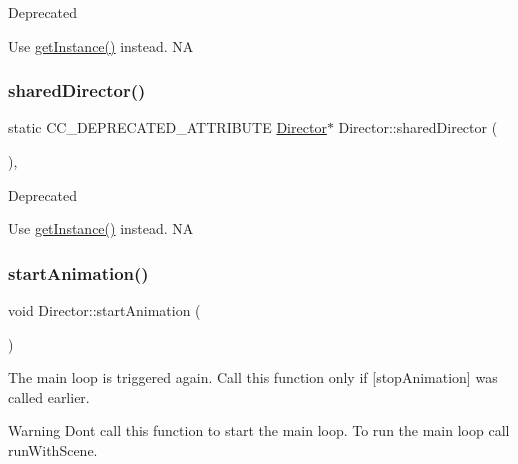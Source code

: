 \begin{DoxyRefDesc}{Deprecated}
\item[\hyperlink{deprecated__deprecated000051}{Deprecated}]Use \hyperlink{classDirector_a8d2a4ca9e20cd400ddadd516efa111e0}{get\+Instance()} instead.  NA \end{DoxyRefDesc}
\mbox{\label{classDirector_ade6993ad99aefbbe5643b60749871a39}} 
\subsubsection{\texorpdfstring{shared\+Director()}{sharedDirector()}\hspace{0.1cm}{\footnotesize\ttfamily [2/2]}}
{\footnotesize\ttfamily static C\+C\+\_\+\+D\+E\+P\+R\+E\+C\+A\+T\+E\+D\+\_\+\+A\+T\+T\+R\+I\+B\+U\+TE \hyperlink{classDirector}{Director}$\ast$ Director\+::shared\+Director (\begin{DoxyParamCaption}{ }\end{DoxyParamCaption})\hspace{0.3cm}{\ttfamily [inline]}, {\ttfamily [static]}}

\begin{DoxyRefDesc}{Deprecated}
\item[\hyperlink{deprecated__deprecated000286}{Deprecated}]Use \hyperlink{classDirector_a8d2a4ca9e20cd400ddadd516efa111e0}{get\+Instance()} instead.  NA \end{DoxyRefDesc}
\mbox{\label{classDirector_a122d685c783d0c2b7e2d22ba1ecb0d91}} 
\subsubsection{\texorpdfstring{start\+Animation()}{startAnimation()}\hspace{0.1cm}{\footnotesize\ttfamily [1/2]}}
{\footnotesize\ttfamily void Director\+::start\+Animation (\begin{DoxyParamCaption}{ }\end{DoxyParamCaption})\hspace{0.3cm}{\ttfamily [pure virtual]}}

The main loop is triggered again. Call this function only if \mbox{[}stop\+Animation\mbox{]} was called earlier. \begin{DoxyWarning}{Warning}
Don\textquotesingle{}t call this function to start the main loop. To run the main loop call run\+With\+Scene. 
\end{DoxyWarning}


